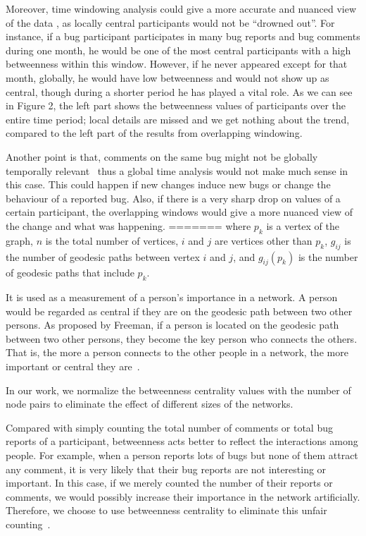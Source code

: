 \documentclass[conference]{IEEEtran}
\begin{document}
Moreover, time windowing analysis could give a more accurate and
nuanced view of the data \cite{ICSEsocio:meneely}
\cite{ICSMwindowed:hindle}, as locally central participants would not
be ``drowned out''. For instance, if a
bug participant participates in many bug reports and bug comments during one
month, he would be one of the most central participants with a high
betweenness within this window. However, if he never appeared except for that
month, globally, he would have low betweenness and would not show up
as central, though during a shorter period he has played a vital role. 
As we can see in Figure 2, the left part shows the betweenness values of participants 
over the entire time period; local details are missed and we get nothing about the trend, compared to the left part of the results from overlapping windowing.


Another point is that, comments on the same bug might not be globally
temporally relevant~\cite{Springer:kidane,Procedia:ibaa} thus 
 a global time analysis would not make much sense in this case. This
 could happen if new changes induce new bugs or change the behaviour
 of a reported bug. Also, if there
is a very sharp drop on values of a certain participant, the
overlapping windows would give a more nuanced view of the change and
what was happening.
=======
where $p_k$ is a vertex of the graph, $n$ is the total number of
vertices, $i$ and $j$ are vertices other than $p_k$, $g_{ij}$ is the
number of geodesic paths between vertex $i$ and $j$, and $g_{ij}(p_k)$
is the number of geodesic paths that include $p_k$.


It is used as a measurement of a person's importance in a network. 
A person would be regarded as central if they are on the geodesic path
between two other persons. 
As proposed by Freeman, if a person is located
on the geodesic path between two other persons, they become the key
person who connects the others. 
That is, the more a person connects to
the other people in a network, the more important or central they 
are~\cite{BOOK:han}.


In our work, we normalize the betweenness centrality values with the
number of node pairs to eliminate the effect of different sizes of the
networks.


Compared with simply counting the total number of comments or total
bug reports of a participant, betweenness acts better to reflect the
interactions among people. For example, when a person reports lots of
bugs but none of them attract any comment, it is very likely that
their bug reports are not interesting or important. In this case, if
we merely counted the number of their reports or comments, we would
possibly increase their importance in the network
artificially. Therefore, we choose to use betweenness centrality to
eliminate this unfair counting~\cite{ICSEsocio:la}.
\end{document}
